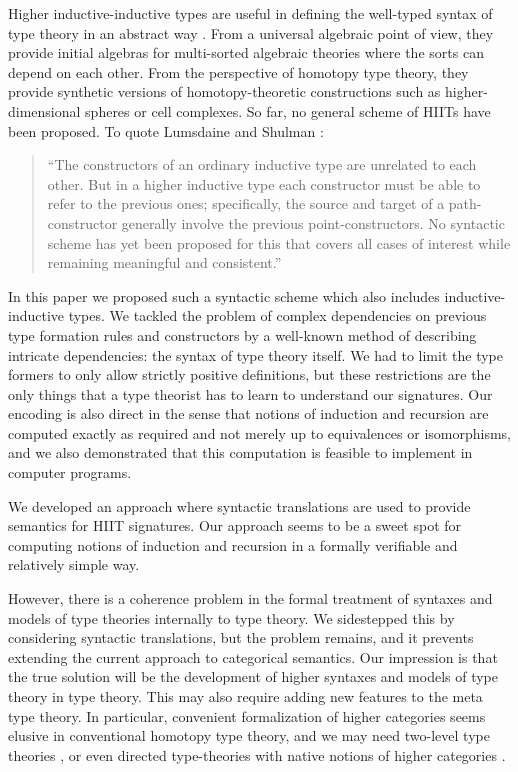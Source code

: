 \documentclass[dvipsnames]{lmcs} %
\newcommand{\1}{\mathsf{1}} \renewcommand{\Pr}{\mathsf{Pr}}
\theoremstyle{plain}\newtheorem{satz}[thm]{Satz} %
\begin{document}
Higher inductive-inductive types are useful in defining the well-typed syntax of
type theory in an abstract way \cite{ttintt}. From a universal algebraic point of
view, they provide initial algebras for multi-sorted algebraic theories where
the sorts can depend on each other. From the perspective of homotopy type
theory, they provide synthetic versions of homotopy-theoretic constructions such
as higher-dimensional spheres or cell complexes. So far, no general scheme of
HIITs have been proposed. To quote Lumsdaine and Shulman
\cite{lumsdaineShulman}:
\begin{quotation}
``The constructors of an ordinary inductive type are unrelated to each
other.  But in a higher inductive type each constructor must be able
to refer to the previous ones; specifically, the source and target of
a path-constructor generally involve the previous
point-constructors. No syntactic scheme has yet been proposed for this
that covers all cases of interest while remaining meaningful and
consistent.''
\end{quotation}
In this paper we proposed such a syntactic scheme which also includes
inductive-inductive types. We tackled the problem of complex dependencies on
previous type formation rules and constructors by a well-known method of
describing intricate dependencies: the syntax of type theory itself. We had to
limit the type formers to only allow strictly positive definitions, but these
restrictions are the only things that a type theorist has to learn to understand
our signatures. Our encoding is also direct in the sense that notions of
induction and recursion are computed exactly as required and not merely up to
equivalences or isomorphisms, and we also demonstrated that this computation is
feasible to implement in computer programs.

We developed an approach where syntactic translations are used to provide
semantics for HIIT signatures. Our approach seems to be a sweet spot for
computing notions of induction and recursion in a formally verifiable and
relatively simple way.

However, there is a coherence problem in the formal treatment of syntaxes and
models of type theories internally to type theory. We sidestepped this by
considering syntactic translations, but the problem remains, and it prevents
extending the current approach to categorical semantics. Our impression is that
the true solution will be the development of higher syntaxes and models of type
theory in type theory. This may also require adding new features to the
meta type theory. In particular, convenient formalization of higher categories
seems elusive in conventional homotopy type theory, and we may need two-level
type theories \cite{semisegal}, or even directed type-theories with native
notions of higher categories \cite{nuyts2015towards, riehl2017type}.
\end{document}
